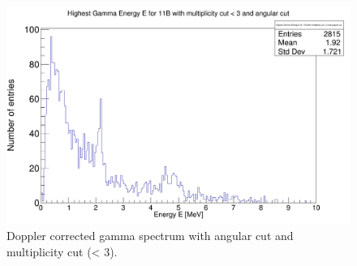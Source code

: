 \documentclass{report}
\begin{document}
\begin{figure}[hbt!]
  \includegraphics[width=\linewidth]{gamma_angular_and_mult_cut.png}
  \caption{Doppler corrected gamma spectrum with angular cut and multiplicity cut (< 3).}
  \label{fig:gamma_angular_and_mult_cut}
\end{figure}
\end{document}
